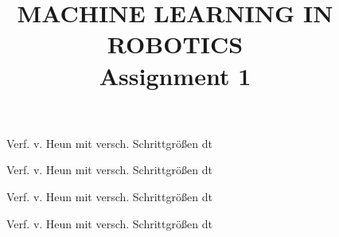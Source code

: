 \documentclass[conference]{IEEEtran}
\begin{document}
%
%
\title{MACHINE LEARNING IN ROBOTICS\\ Assignment 1}

\author{
}


\maketitle

\IEEEpeerreviewmaketitle

\begin{figure}[h!]
  	\centering
    \scalebox{.6}{}
    \caption{Verf. v. Heun mit versch. Schrittgrößen dt}
    \label{fig:heun}
\end{figure}

\begin{figure}[h!]
  	\centering
    \scalebox{.6}{}
    \caption{Verf. v. Heun mit versch. Schrittgrößen dt}
    \label{fig:heun}
\end{figure}

\begin{figure}[h!]
  	\centering
    \scalebox{.6}{}
    \caption{Verf. v. Heun mit versch. Schrittgrößen dt}
    \label{fig:heun}
\end{figure}

\begin{figure}[h!]
  	\centering
    \scalebox{.6}{}
    \caption{Verf. v. Heun mit versch. Schrittgrößen dt}
    \label{fig:heun}
\end{figure}
\end{document}
